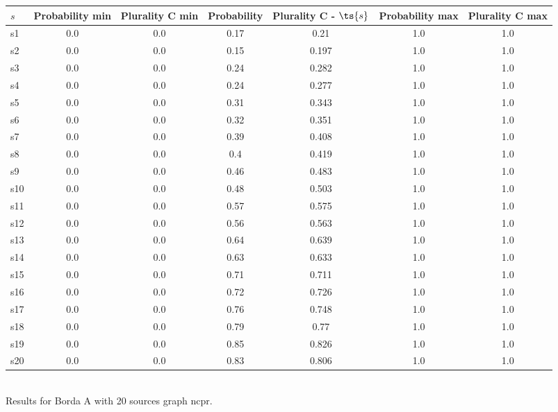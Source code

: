 \documentclass{article}
\begin{document}
\noindent\begin{tabular}{|l|c|c|c|c|c|c|}
\hline
$s$& Probability min & Plurality C min & Probability & Plurality C - $\ts{s}$ & Probability max & Plurality C max\\
\hline
s1 &0.0 & 0.0 & 0.17 & 0.21 & 1.0 & 1.0\\
\hline
s2 &0.0 & 0.0 & 0.15 & 0.197 & 1.0 & 1.0\\
\hline
s3 &0.0 & 0.0 & 0.24 & 0.282 & 1.0 & 1.0\\
\hline
s4 &0.0 & 0.0 & 0.24 & 0.277 & 1.0 & 1.0\\
\hline
s5 &0.0 & 0.0 & 0.31 & 0.343 & 1.0 & 1.0\\
\hline
s6 &0.0 & 0.0 & 0.32 & 0.351 & 1.0 & 1.0\\
\hline
s7 &0.0 & 0.0 & 0.39 & 0.408 & 1.0 & 1.0\\
\hline
s8 &0.0 & 0.0 & 0.4 & 0.419 & 1.0 & 1.0\\
\hline
s9 &0.0 & 0.0 & 0.46 & 0.483 & 1.0 & 1.0\\
\hline
s10 &0.0 & 0.0 & 0.48 & 0.503 & 1.0 & 1.0\\
\hline
s11 &0.0 & 0.0 & 0.57 & 0.575 & 1.0 & 1.0\\
\hline
s12 &0.0 & 0.0 & 0.56 & 0.563 & 1.0 & 1.0\\
\hline
s13 &0.0 & 0.0 & 0.64 & 0.639 & 1.0 & 1.0\\
\hline
s14 &0.0 & 0.0 & 0.63 & 0.633 & 1.0 & 1.0\\
\hline
s15 &0.0 & 0.0 & 0.71 & 0.711 & 1.0 & 1.0\\
\hline
s16 &0.0 & 0.0 & 0.72 & 0.726 & 1.0 & 1.0\\
\hline
s17 &0.0 & 0.0 & 0.76 & 0.748 & 1.0 & 1.0\\
\hline
s18 &0.0 & 0.0 & 0.79 & 0.77 & 1.0 & 1.0\\
\hline
s19 &0.0 & 0.0 & 0.85 & 0.826 & 1.0 & 1.0\\
\hline
s20 &0.0 & 0.0 & 0.83 & 0.806 & 1.0 & 1.0\\
\hline
\end{tabular}\\

\noindent Results for Borda A with 20 sources graph ncpr.
\end{document}
